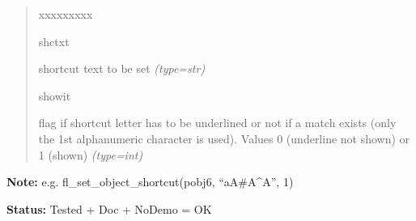 \begin{boxedminipage}{\funcwidth}
\begin{quote}
\begin{Ventry}{xxxxxxxxx}
          \item[shctxt]


shortcut text to be set
            {\it (type=str)}

          \item[showit]


flag if shortcut letter has to be underlined or not if a match exists
(only the 1st alphanumeric character is used). Values 0 (underline not
shown) or 1 (shown)
            {\it (type=int)}

        \end{Ventry}

      \end{quote}

\textbf{Note:} 
e.g. fl\_set\_object\_shortcut(pobj6, ``aA\#A\textasciicircum{}A'', 1)


\textbf{Status:} 
Tested + Doc + NoDemo = OK


    \end{boxedminipage}

    \label{xformslib:flbasic:fl_set_object_shortcutkey}

    \vspace{0.5ex}

